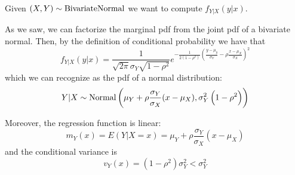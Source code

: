 \documentclass[12pt]{extarticle}
\newcommand{\Normal}{{\operatorfont Normal}}
\newcommand{\BivariateNormal}{{\operatorfont BivariateNormal}}
\begin{document}
\begin{example}
    Given $(X, Y) \sim \BivariateNormal$ we want to compute $f_{Y|X}(y|x)$.

    As we saw, we can factorize the marginal pdf from the joint pdf of a bivariate normal.
    Then, by the definition of conditional probability we have that
    \begin{equation}
        f_{Y|X}(y|x) = \frac{1}{\sqrt{2 \pi} \sigma_Y \sqrt{1-\rho^2}} e^{-\frac{1}{2(1-\rho^2)}\left( \frac{y-\mu_y}{\sigma_Y} - \rho \frac{x-\mu_X}{\sigma_X} \right)^2}
    \end{equation}
    which we can recognize as the pdf of a normal distribution:
    \begin{equation}
        Y|X \sim \Normal\left(\mu_Y + \rho\frac{\sigma_Y}{\sigma_X}(x - \mu_X), \sigma_Y^2\left(1-\rho^2\right)\right)
    \end{equation}

    Moreover, the regression function is linear:
    \begin{equation}
        m_Y(x) = E(Y|X = x) = \mu_Y + \rho \frac{\sigma_Y}{\sigma_X} (x - \mu_X)
    \end{equation}
    and the conditional variance is
    \begin{equation}
        v_Y(x) = \left(1- \rho^2\right) \sigma_Y^2 < \sigma_Y^2
    \end{equation}
\end{example}
\end{document}
